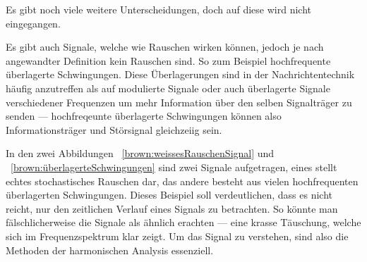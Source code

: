 Es gibt noch viele weitere Unterscheidungen, doch auf diese wird nicht eingegangen.


Es gibt auch Signale, welche wie Rauschen wirken können, jedoch je nach angewandter Definition kein Rauschen sind. So zum Beispiel hochfrequente überlagerte Schwingungen. Diese Überlagerungen sind in der Nachrichtentechnik häufig anzutreffen als auf modulierte Signale oder auch überlagerte Signale verschiedener Frequenzen um mehr Information über den selben Signalträger zu senden --- hochfreqeunte überlagerte Schwingungen können also Informationsträger und Störsignal gleichzeiig sein.


In den zwei Abbildungen ~\ref{brown:weissesRauschenSignal} und ~\ref{brown:überlagerteSchwingungen} sind zwei Signale aufgetragen, eines stellt echtes stochastisches Rauschen dar, das andere besteht aus vielen hochfrequenten überlagerten Schwingungen. Dieses Beispiel soll verdeutlichen, dass es nicht reicht, nur den zeitlichen Verlauf eines Signals zu betrachten. So könnte man fälschlicherweise die Signale als ähnlich erachten --- eine krasse Täuschung, welche sich im Frequenzspektrum klar zeigt. Um das Signal zu verstehen, sind also die Methoden  der harmonischen Analysis essenziell. 

